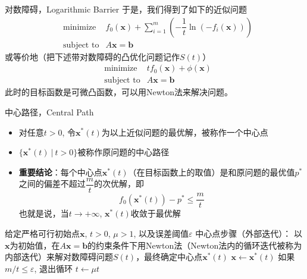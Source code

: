 
\begin{frame}

\begin{block}{对数障碍，Logarithmic Barrier}
于是，我们得到了如下的近似问题
\begin{eqnarray*}
& \text{minimize} & f_0(\mathbf{x}) + \sum\limits_{i=1}^m \left( -\dfrac{1}{t}\ln(-f_i(\mathbf{x})) \right) \\
& \text{subject to} & A\mathbf{x} = \mathbf{b}
\end{eqnarray*}
或等价地（把下述带对数障碍的凸优化问题记作$S(t)$）
\begin{eqnarray*}
& \text{minimize} & tf_0(\mathbf{x}) + \phi(\mathbf{x}) \\
& \text{subject to} & A\mathbf{x} = \mathbf{b}
\end{eqnarray*}
此时的目标函数是可微凸函数，可以用Newton法来解决问题。
\end{block}

\end{frame}


\begin{frame}

\begin{block}{中心路径，Central Path}
\begin{itemize}
\item 对任意$t>0$, 令$\mathbf{x}^*(t)$为以上近似问题的最优解，被称作一个中心点
\item $\{\mathbf{x}^*(t) \ |\ t > 0\}$被称作原问题的中心路径
\item {\bfseries 重要结论}：每个中心点$\mathbf{x}^*(t)$（在目标函数上的取值）是和原问题的最优值$p^*$之间的偏差不超过$\dfrac{m}{t}$的次优解，即
$$f_0(\mathbf{x}^*(t)) - p^* \le \dfrac{m}{t}$$
也就是说，当$t\to+\infty$, $\mathbf{x}^*(t)$收敛于最优解
\end{itemize}
\end{block}

\end{frame}


\begin{frame}

\begin{algorithm}[H]
\SetAlgoLined
\DontPrintSemicolon
{}

给定严格可行初始点$\mathbf{x}$, $t > 0$, $\mu > 1$, 以及误差阈值$\varepsilon$ \;
{
中心点步骤（外部迭代）：\newline
\hspace{1em}以$\mathbf{x}$为初始值，在$A\mathbf{x} = \mathbf{b}$的约束条件下用Newton法（Newton法内的循环迭代被称为内部迭代）来解对数障碍问题$S(t)$，最终确定中心点$\mathbf{x}^*(t)$ \;
$\mathbf{x} \gets \mathbf{x}^*(t)$ \;
如果$m/t \le \varepsilon$, 退出循环 \;
$t \gets \mu t$
}
\caption{内点法（障碍方法）}
\end{algorithm}

\end{frame}

